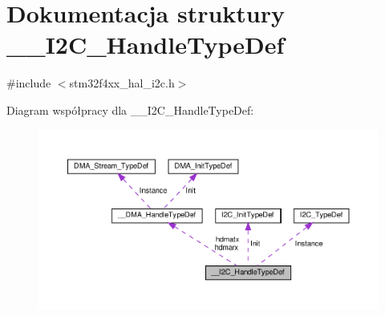 \hypertarget{struct_____i2_c___handle_type_def}{}\section{Dokumentacja struktury \+\_\+\+\_\+\+I2\+C\+\_\+\+Handle\+Type\+Def}
\label{struct_____i2_c___handle_type_def}


{\ttfamily \#include $<$stm32f4xx\+\_\+hal\+\_\+i2c.\+h$>$}



Diagram współpracy dla \+\_\+\+\_\+\+I2\+C\+\_\+\+Handle\+Type\+Def\+:\nopagebreak
\begin{figure}[H]
\begin{center}
\leavevmode
\includegraphics[width=350pt]{struct_____i2_c___handle_type_def__coll__graph}
\end{center}
\end{figure}

